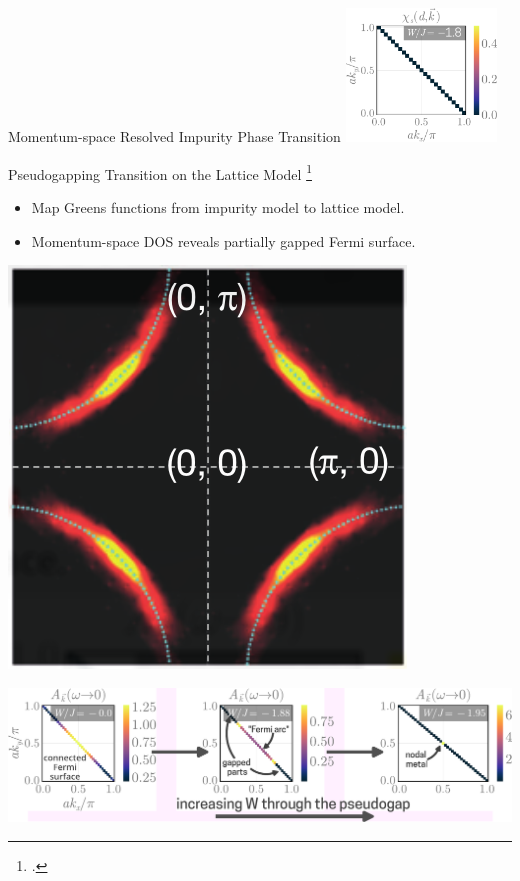\documentclass[10pt,aspectratio=169]{beamer}
\begin{document}
\begin{frame}{Momentum-space Resolved Impurity Phase Transition}
{		\hspace*{\fill}
		\includegraphics[width=0.3\textwidth]{SF-6.pdf}
	}
\end{frame}

\begin{frame}{Pseudogapping Transition on the Lattice Model}
	\footcite{keimer2015quantum}
	\begin{minipage}{0.5\textwidth}
	\begin{itemize}
		\item Map Greens functions from impurity model to \alert{lattice model}.
		\item Momentum-space DOS reveals \alert{partially gapped} Fermi surface.
	\end{itemize}
	\end{minipage}
	\hfill
	\begin{minipage}{0.2\textwidth}
		\includegraphics[width=\textwidth]{fermiArc1.png}
	\end{minipage}
	
	\includegraphics[width=\textwidth]{kspaceDOS.pdf}
\end{frame}
\end{document}
